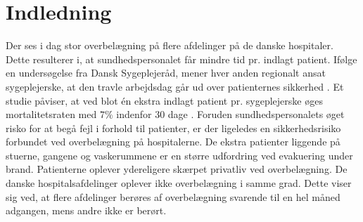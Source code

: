 \chapter{Indledning}
Der ses i dag stor overbelægning på flere afdelinger på de danske hospitaler. Dette resulterer i, at sundhedspersonalet får mindre tid pr. indlagt patient. Ifølge en undersøgelse fra Dansk Sygeplejeråd, mener hver anden regionalt ansat sygeplejerske, at den travle arbejdsdag går ud over patienternes sikkerhed \citep{Kjeldsen2015}. Et studie påviser, at ved blot én ekstra indlagt patient pr. sygeplejerske øges mortalitetsraten med $7 \%$ indenfor 30 dage  \citep{Aiken2014}. 
Foruden sundhedspersonalets øget risko for at begå fejl i forhold til patienter, er der ligeledes en sikkerhedsrisiko forbundet ved overbelægning på hospitalerne. De ekstra patienter liggende på stuerne, gangene og vaskerummene er en større udfordring ved evakuering under brand. Patienterne oplever ydereligere skærpet privatliv ved overbelægning. \citep{Madsen2014} 
De danske hospitalsafdelinger oplever ikke overbelægning i samme grad. Dette viser sig ved, at flere afdelinger berøres af overbelægning svarende til en hel måned adgangen, mens andre ikke er berørt. \citep{2015}

